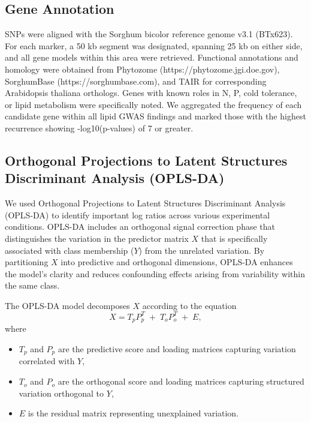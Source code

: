 \documentclass[10pt,letterpaper]{article}
\begin{document}
\subsection*{Gene Annotation}
SNPs were aligned with the Sorghum bicolor reference genome v3.1 (BTx623). For each marker, a 50 kb segment was designated, spanning 25 kb on either side, and all gene models within this area were retrieved. Functional annotations and homology were obtained from Phytozome (https://phytozome.jgi.doe.gov), SorghumBase (https://sorghumbase.com), and TAIR for corresponding Arabidopsis thaliana orthologs. Genes with known roles in N, P, cold tolerance, or lipid metabolism were specifically noted. We aggregated the frequency of each candidate gene within all lipid GWAS findings and marked those with the highest recurrence showing -log10(p-values) of 7 or greater.

\subsection*{Orthogonal Projections to Latent Structures Discriminant Analysis (OPLS-DA)}
We used Orthogonal Projections to Latent Structures Discriminant Analysis (OPLS-DA) to identify important log ratios across various experimental conditions. OPLS-DA includes an orthogonal signal correction phase that distinguishes the variation in the predictor matrix \(X\) that is specifically associated with class membership (\(Y\)) from the unrelated variation. By partitioning \(X\) into predictive and orthogonal dimensions, OPLS-DA enhances the model's clarity and reduces confounding effects arising from variability within the same class.

The OPLS-DA model decomposes \(X\) according to the equation
\[
  X = T_{p} P_{p}^{T} \;+\; T_{o} P_{o}^{T} \;+\; E,
\]
where
\begin{itemize}
  \item \(T_{p}\) and \(P_{p}\) are the predictive score and loading matrices capturing variation correlated with \(Y\),
  \item \(T_{o}\) and \(P_{o}\) are the orthogonal score and loading matrices capturing structured variation orthogonal to \(Y\),
  \item \(E\) is the residual matrix representing unexplained variation.
\end{itemize}
\end{document}
